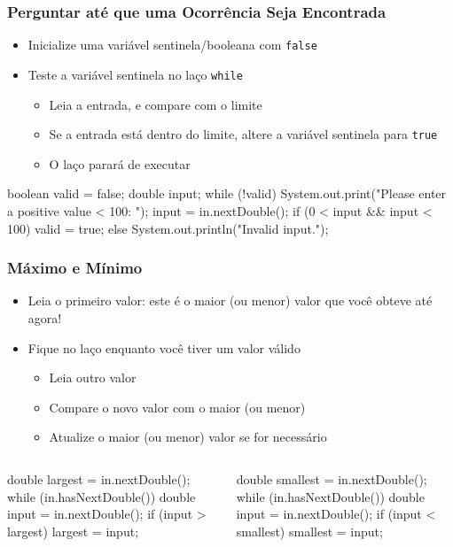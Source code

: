 \documentclass[xcolor={dvipsnames,table},aspectratio=169]{beamer}
\begin{document}
\begin{frame}[fragile]\frametitle{Perguntar até que uma Ocorrência Seja Encontrada}
\begin{itemize}
	\item Inicialize uma variável sentinela/booleana com \texttt{false}
	\item Teste a variável sentinela no laço \texttt{while}
	\begin{itemize}
		\item Leia a entrada, e compare com o limite
		\item Se a entrada está dentro do limite, altere a variável sentinela para \texttt{true}
		\item O laço parará de executar
	\end{itemize}
\end{itemize}
{\footnotesize
\begin{javacode}
boolean valid = false;
double input;
while (!valid) {
   System.out.print("Please enter a positive value < 100: ");
   input = in.nextDouble();
   if (0 < input && input < 100) { valid = true; }
   else { System.out.println("Invalid input."); }
}
\end{javacode}
}
\end{frame}

\begin{frame}[fragile]\frametitle{Máximo e Mínimo}
\begin{itemize}
	\item Leia o primeiro valor: este é o maior (ou menor) valor que você obteve até agora!
	\item Fique no laço enquanto você tiver um valor válido
	\begin{itemize}
		\item Leia outro valor
		\item Compare o novo valor com o maior (ou menor)
		\item Atualize o maior (ou menor) valor se for necessário
	\end{itemize}
\end{itemize}
\begin{columns}[T]
	\begin{column}{0.5\linewidth}
{\footnotesize
\begin{javacode}
double largest = in.nextDouble();
while (in.hasNextDouble()) {
   double input = in.nextDouble();
   if (input > largest) {
      largest = input;
   }
}
\end{javacode}
}
	\end{column}
	\begin{column}{0.5\linewidth}
{\footnotesize
\begin{javacode}
double smallest = in.nextDouble();
while (in.hasNextDouble()) {
   double input = in.nextDouble();
   if (input < smallest) {
      smallest = input;
   }
}
\end{javacode}
}
	\end{column}
\end{columns}
\end{frame}
\end{document}
